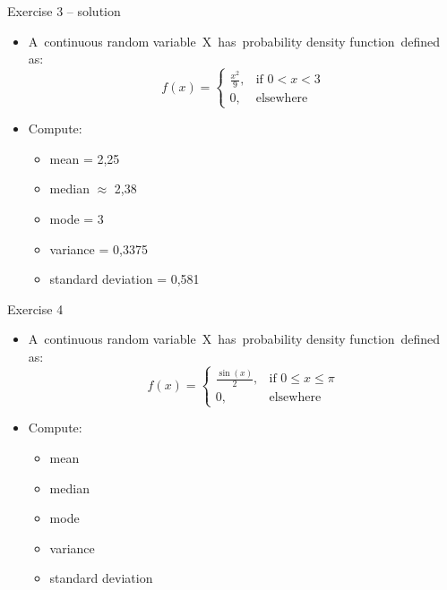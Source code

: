\documentclass{beamer}
\begin{document}
\begin{frame}
{\centerline{Exercise 3 -- solution}}
\begin{itemize}
    \item A continuous random variable X has probability density function defined as:
    \begin{equation*}
        
  f(x)=\left\{
        \begin{array}{ll}
             \frac{x^{2}}{9}, & \mbox{if $0<x<3$}\\
                0, & \mbox{elsewhere}
         \end{array}
        \right.
    \end{equation*}
    \newline
    \item Compute:
    \begin{itemize}
        \item mean = 2,25
        \item median $\approx$ 2,38
        \item mode = 3
        \item variance = 0,3375
        \item standard deviation = 0,581
    \end{itemize}
\end{itemize}
\end{frame}

\begin{frame}
{\centerline{Exercise 4}}
\begin{itemize}
    \item A continuous random variable X has probability density function defined as:
    \begin{equation*}
        
  f(x)=\left\{
        \begin{array}{ll}
             \frac{\sin(x)}{2}, & \mbox{if $0 \leq x \leq \pi$}\\
                0, & \mbox{elsewhere}
         \end{array}
        \right.
    \end{equation*}
    \newline
    \item Compute:
    \begin{itemize}
        \item mean
        \item median
        \item mode
        \item variance
        \item standard deviation
    \end{itemize}
\end{itemize}
\end{frame}
\end{document}
